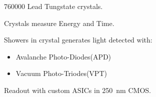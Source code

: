 \documentclass{beamer}
\begin{document}
\begin{frame}
\begin{tcolorbox}[colback=UNL@Cream!5,colframe=UNL@Cream!70,title=\textcolor{UMN@Maroon}{\textbf{ECAL Detector.}}]
    \end{tcolorbox} 
   
   \vspace{-0.1cm}
    \begin{columns}
    \begin{column}{0.60\linewidth}
      \begin{tcolorbox}[colback=UNL@Cream!5,colframe=UNL@Cream!70,title=\textcolor{UMN@Maroon}{\textbf{ECAL Properties.}}]
      \begin{itemize}
       \tiny{
        \item 760000 Lead Tungstate crystals.
        \item Crystals measure Energy and Time.
        \item Showers in crystal generates light detected with:
          \begin{itemize}
           \item \tiny{Avalanche Photo-Diodes(APD)}
           \item \tiny{ Vacuum Photo-Triodes(VPT)}
          \end{itemize}
        \item Readout with custom ASICs in 250~nm CMOS.
       }
      \end{itemize}
    

\end{tcolorbox}
\end{column}
\end{columns}
\end{frame}
\end{document}

